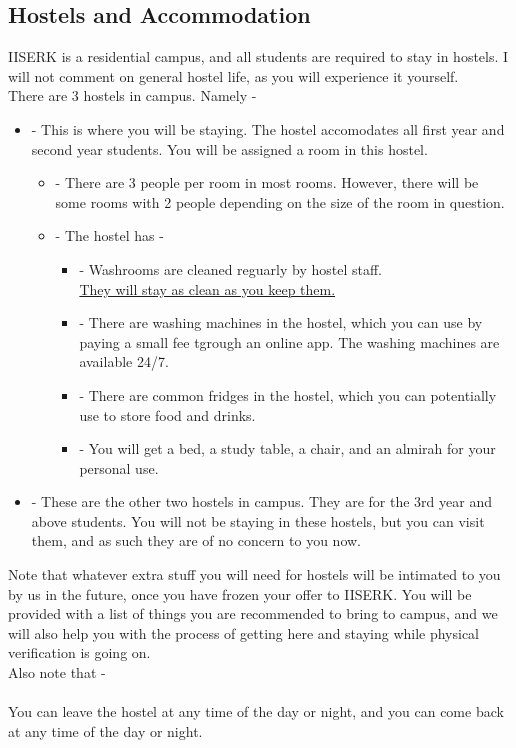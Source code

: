 \documentclass[openany]{book}
\begin{document}
\subsection{Hostels and Accommodation}
IISERK is a residential campus, and all students are required to stay in hostels. I will not comment on general hostel life, as you will experience it yourself. \\
There are 3 hostels in campus. Namely - 
\begin{itemize}
    \item {} - This is where you will be staying. The hostel accomodates all first year and second year students. You will be assigned a room in this hostel. 
    \begin{itemize}
        \item {} - There are 3 people per room in most rooms. However, there will be some rooms with 2 people depending on the size of the room in question.
        \item {} - The hostel has - 
        \begin{itemize}
            \item {} - Washrooms are cleaned reguarly by hostel staff.\\ 
            \underline{They will stay as clean as you keep them.}
            \item {} - There are washing machines in the hostel, which you can use by paying a small fee tgrough an online app. The washing machines are available 24/7.
            \item {} - There are common fridges in the hostel, which you can potentially use to store food and drinks. 
            \item {} - You will get a bed, a study table, a chair, and an almirah for your personal use. 
        \end{itemize}
    \end{itemize}
     \item {} - These are the other two hostels in campus. They are for the 3rd year and above students. You will not be staying in these hostels, but you can visit them, and as such they are of no concern to you now. 
\end{itemize}
\begin{mynote}
    Note that whatever extra stuff you will need for hostels will be intimated to you by us in the future, once you have frozen your offer to IISERK. You will be provided with a list of things you are recommended to bring to campus, and we will also help you with the process of getting here and staying while physical verification is going on. \\
    Also note that - \\
     \\ 
    You can leave the hostel at any time of the day or night, and you can come back at any time of the day or night.
\end{mynote}
\end{document}
